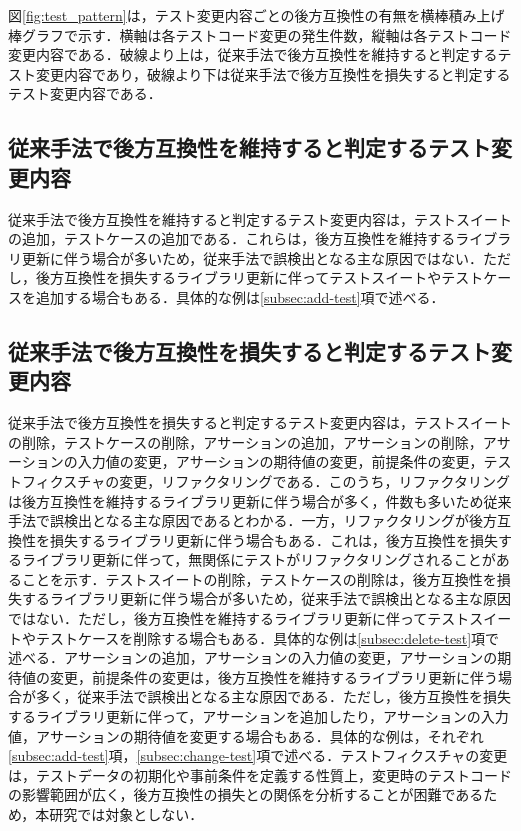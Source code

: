 \documentclass[submit]{ipsj}
\begin{document}
図\ref{fig:test_pattern}は，テスト変更内容ごとの後方互換性の有無を横棒積み上げ棒グラフで示す．横軸は各テストコード変更の発生件数，縦軸は各テストコード変更内容である．破線より上は，従来手法で後方互換性を維持すると判定するテスト変更内容であり，破線より下は従来手法で後方互換性を損失すると判定するテスト変更内容である．

\subsection{従来手法で後方互換性を維持すると判定するテスト変更内容}
従来手法で後方互換性を維持すると判定するテスト変更内容は，テストスイートの追加，テストケースの追加である．これらは，後方互換性を維持するライブラリ更新に伴う場合が多いため，従来手法で誤検出となる主な原因ではない．ただし，後方互換性を損失するライブラリ更新に伴ってテストスイートやテストケースを追加する場合もある．具体的な例は\ref{subsec:add-test}項で述べる．

\subsection{従来手法で後方互換性を損失すると判定するテスト変更内容}
従来手法で後方互換性を損失すると判定するテスト変更内容は，テストスイートの削除，テストケースの削除，アサーションの追加，アサーションの削除，アサーションの入力値の変更，アサーションの期待値の変更，前提条件の変更，テストフィクスチャの変更，リファクタリングである．このうち，リファクタリングは後方互換性を維持するライブラリ更新に伴う場合が多く，件数も多いため従来手法で誤検出となる主な原因であるとわかる．一方，リファクタリングが後方互換性を損失するライブラリ更新に伴う場合もある．これは，後方互換性を損失するライブラリ更新に伴って，無関係にテストがリファクタリングされることがあることを示す．テストスイートの削除，テストケースの削除は，後方互換性を損失するライブラリ更新に伴う場合が多いため，従来手法で誤検出となる主な原因ではない．ただし，後方互換性を維持するライブラリ更新に伴ってテストスイートやテストケースを削除する場合もある．具体的な例は\ref{subsec:delete-test}項で述べる．アサーションの追加，アサーションの入力値の変更，アサーションの期待値の変更，前提条件の変更は，後方互換性を維持するライブラリ更新に伴う場合が多く，従来手法で誤検出となる主な原因である．ただし，後方互換性を損失するライブラリ更新に伴って，アサーションを追加したり，アサーションの入力値，アサーションの期待値を変更する場合もある．具体的な例は，それぞれ\ref{subsec:add-test}項，\ref{subsec:change-test}項で述べる．テストフィクスチャの変更は，テストデータの初期化や事前条件を定義する性質上，変更時のテストコードの影響範囲が広く，後方互換性の損失との関係を分析することが困難であるため，本研究では対象としない．
\end{document}
